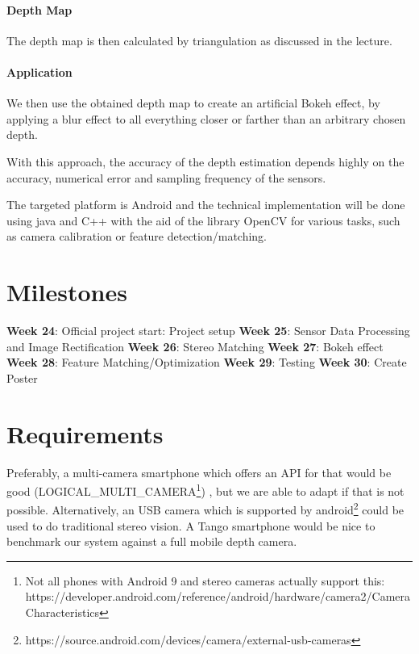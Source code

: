 \documentclass[a4paper,pagesize 10pt]{scrartcl}
\begin{document}
\paragraph{Depth Map}
The depth map is then calculated by triangulation as discussed in the lecture.
\paragraph{Application}
We then use the obtained depth map to create an artificial Bokeh effect, by applying a blur effect to all everything closer or farther than an arbitrary chosen depth.


With this approach, the accuracy of the depth estimation depends highly on the accuracy, numerical error and sampling frequency of the sensors.

The targeted platform is Android and the technical implementation will be done using java and C++ with the aid of the library OpenCV for various tasks, such as camera calibration or feature detection/matching.

%
%
\section{Milestones}
\textbf{Week 24}: Official project start: Project setup\newline
\textbf{Week 25}: Sensor Data Processing and Image Rectification\newline
\textbf{Week 26}: Stereo Matching\newline
\textbf{Week 27}: Bokeh effect\newline
\textbf{Week 28}: Feature Matching/Optimization \newline
\textbf{Week 29}: Testing\newline
\textbf{Week 30}: Create Poster\newline
\section{Requirements}
Preferably, a multi-camera smartphone which offers an API for that would be good  (LOGICAL\_MULTI\_CAMERA\footnote{Not all phones with Android 9 and stereo cameras actually support this: https://developer.android.com/reference/android/hardware/camera2/CameraCharacteristics}) , but we are able to adapt if that is not possible. Alternatively, an USB camera which is supported by android\footnote{https://source.android.com/devices/camera/external-usb-cameras} could be used to do traditional stereo vision. A Tango smartphone would be nice to benchmark our system against a full mobile depth camera.
\end{document}

